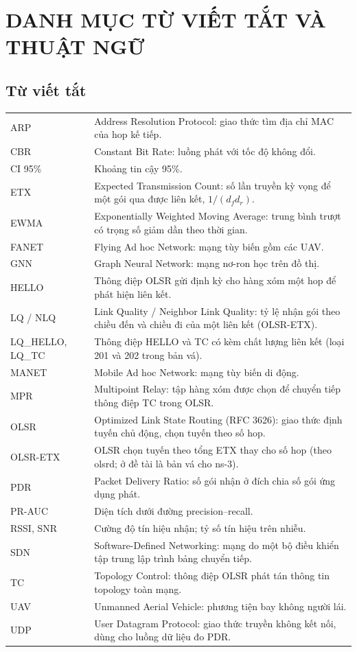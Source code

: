 \documentclass[12pt,a4paper]{report}
\begin{document}
\chapter*{DANH MỤC TỪ VIẾT TẮT VÀ THUẬT NGỮ}
\section*{Từ viết tắt}
{\small
\begin{longtable}{@{}P{4.2cm}p{11.2cm}@{}}
\toprule\endhead
ARP&Address Resolution Protocol: giao thức tìm địa chỉ MAC của hop kế tiếp.\\
CBR&Constant Bit Rate: luồng phát với tốc độ không đổi.\\
CI 95\%&Khoảng tin cậy 95\%.\\
ETX&Expected Transmission Count: số lần truyền kỳ vọng để một gói qua được liên kết, $1/(d_f d_r)$.\\
EWMA&Exponentially Weighted Moving Average: trung bình trượt có trọng số giảm dần theo thời gian.\\
FANET&Flying Ad hoc Network: mạng tùy biến gồm các UAV.\\
GNN&Graph Neural Network: mạng nơ-ron học trên đồ thị.\\
HELLO&Thông điệp OLSR gửi định kỳ cho hàng xóm một hop để phát hiện liên kết.\\
LQ / NLQ&Link Quality / Neighbor Link Quality: tỷ lệ nhận gói theo chiều đến và chiều đi của một liên kết (OLSR-ETX).\\
LQ\_HELLO, LQ\_TC&Thông điệp HELLO và TC có kèm chất lượng liên kết (loại 201 và 202 trong bản vá).\\
MANET&Mobile Ad hoc Network: mạng tùy biến di động.\\
MPR&Multipoint Relay: tập hàng xóm được chọn để chuyển tiếp thông điệp TC trong OLSR.\\
OLSR&Optimized Link State Routing (RFC 3626): giao thức định tuyến chủ động, chọn tuyến theo số hop.\\
OLSR-ETX&OLSR chọn tuyến theo tổng ETX thay cho số hop (theo olsrd; ở đề tài là bản vá cho ns-3).\\
PDR&Packet Delivery Ratio: số gói nhận ở đích chia số gói ứng dụng phát.\\
PR-AUC&Diện tích dưới đường precision--recall.\\
RSSI, SNR&Cường độ tín hiệu nhận; tỷ số tín hiệu trên nhiễu.\\
SDN&Software-Defined Networking: mạng do một bộ điều khiển tập trung lập trình bảng chuyển tiếp.\\
TC&Topology Control: thông điệp OLSR phát tán thông tin topology toàn mạng.\\
UAV&Unmanned Aerial Vehicle: phương tiện bay không người lái.\\
UDP&User Datagram Protocol: giao thức truyền không kết nối, dùng cho luồng dữ liệu đo PDR.\\
\bottomrule
\end{longtable}
}
\end{document}
